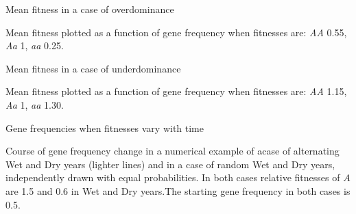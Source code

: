 \documentclass[bluish,slideColor,colorBG,pdf]{prosper}
\begin{document}
\begin{slide}[Replace]{Mean fitness in a case of overdominance}

\centerline{}

\begin{center}
\parbox[t]{3.5in}{Mean fitness plotted as a function of gene frequency when fitnesses are: {\it AA} 0.55, {\it Aa} 1, {\it aa} 0.25.}
\end{center}

\end{slide}

\begin{slide}[Replace]{Mean fitness in a case of underdominance}

\centerline{}

\begin{center}
\parbox[t]{3.5in}{Mean fitness plotted as a function of gene frequency when fitnesses are: {\it AA} 1.15, {\it Aa} 1, {\it aa} 1.30.}
\end{center}

\end{slide}

\begin{slide}[Replace]{Gene frequencies when fitnesses vary with time}

\centerline{}

\begin{center}
\parbox[t]{3.5in}{Course of gene frequency change in a numerical example of acase of alternating Wet and Dry years (lighter lines) and in a case of random Wet and Dry years, independently drawn with equal probabilities. In both cases relative fitnesses of $A$ are 1.5 and 0.6 in Wet and Dry years.The starting gene frequency in both cases is 0.5.  }
\end{center}

\end{slide}
\end{document}
